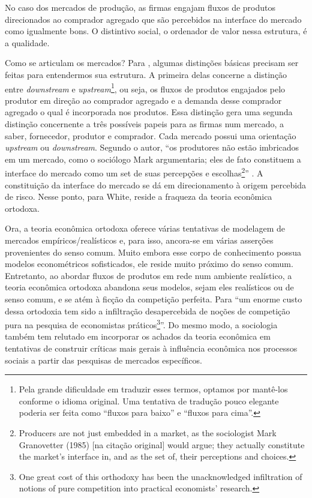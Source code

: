 \documentclass[a4paper, 12pt, openright, oneside, german, french, english, brazil]{abntex2}
\begin{document}
	No caso dos mercados de produção, as firmas engajam fluxos de produtos direcionados ao comprador agregado que são percebidos na interface do mercado como igualmente bons. O distintivo social, o ordenador de valor nessa estrutura, é a qualidade.

	Como se articulam os mercados? Para , algumas distinções básicas precisam ser feitas para entendermos sua estrutura. A primeira delas concerne a distinção entre \textit{downstream} e \textit{upstream}\footnote{Pela grande dificuldade em traduzir esses termos, optamos por mantê-los conforme o idioma original. Uma tentativa de tradução pouco elegante poderia ser feita como ``fluxos para baixo'' e ``fluxos para cima''.}, ou seja, os fluxos de produtos engajados pelo produtor em direção ao comprador agregado e a demanda desse comprador agregado o qual é incorporada nos produtos. Essa distinção gera uma segunda distinção concernente a três possíveis papeis para as firmas num mercado, a saber, fornecedor, produtor e comprador. Cada mercado possui uma orientação \textit{upstream} ou \textit{downstream}. Segundo o autor, ``os produtores não estão imbricados em um mercado, como o sociólogo Mark  argumentaria; eles de fato constituem a interface do mercado como um set de suas percepções e escolhas\footnote{Producers are not just embedded in a market, as the sociologist Mark Granovetter (1985) [na citação original] would argue; they actually constitute the market's interface in, and as the set of, their perceptions and choices.}'' \cite[p. 8]{white2002markets}. A constituição da interface do mercado se dá em direcionamento à origem percebida de risco. Nesse ponto, para White, reside a fraqueza da teoria econômica ortodoxa.

	Ora, a teoria econômica ortodoxa oferece várias tentativas de modelagem de mercados empíricos/realísticos e, para isso, ancora-se em várias asserções provenientes do senso comum. Muito embora esse corpo de conhecimento possua modelos econométricos sofisticados, ele reside muito próximo do senso comum. Entretanto, ao abordar fluxos de produtos em rede num ambiente realístico, a teoria econômica ortodoxa abandona seus modelos, sejam eles realísticos ou de senso comum, e se atém à ficção da competição perfeita. Para  ``um enorme custo dessa ortodoxia tem sido a infiltração desapercebida de noções de competição pura na pesquisa de economistas práticos\footnote{One great cost of this orthodoxy has been the unacknowledged infiltration of notions of pure competition into practical economists' research.}''. Do mesmo modo, a sociologia também tem relutado em incorporar os achados da teoria econômica em tentativas de construir críticas mais gerais à influência econômica nos processos sociais a partir das pesquisas de mercados específicos.
\end{document}
